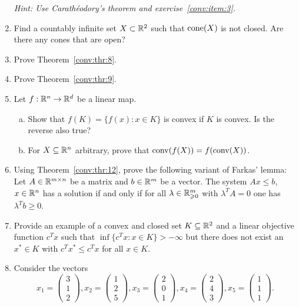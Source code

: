 \begin{enumerate}[1)]
  \emph{Hint: Use Carath\'eodory's theorem and exercise~\ref{conv:item:3}.}
\item Find a countably infinite set $X\subset\mathbb{R}^2$ such that $\mathrm{cone}(X)$ is not closed.
  Are there any cones that are open?
\item Prove Theorem~\ref{conv:thr:8}. 
\item Prove Theorem~\ref{conv:thr:9}. 
\item Let $f: \mathbb{R}^n \to \mathbb{R}^d$ be a linear map. 
  \begin{enumerate}[a)]
  \item Show that $f(K) = \{ f(x) \colon x \in K\}$  is convex if $K$ is
    convex.  Is the reverse also true? 
  \item  For $X\subseteq\mathbb{R}^n$ arbitrary, prove that $\operatorname{conv}(f(X)) = f(\operatorname{conv}(X))$.
  \end{enumerate}
\item
  \label{conv:ex:10}
  Using Theorem~\ref{conv:thr:12}, prove the following variant of Farkas' lemma:
  Let $A\in\mathbb{R}^{m\times n}$ be a matrix and $b\in\mathbb{R}^m$ be a vector.
  The system $Ax \leq b$, $x\in\mathbb{R}^n$ has a solution if and only if
  for all $\lambda\in\mathbb{R}^m_{\geqslant0}$ with $\lambda^T A = 0$ one has $\lambda^T b \geq 0$.
\item 
  \label{ex:16}
  Provide an example of a convex and closed  set $K\subseteq\mathbb{R}^2$ and a
  linear objective function $c^Tx$ such that $\inf\{c^Tx \colon
  x\in K\}>-\infty$ but there does not exist an $x^* \in K$ with $c^Tx^* \leq
  c^Tx$ for all $x \in K$. 
\item Consider the vectors
$$ x_1 = \left(\begin{array}{c} 3 \\ 1 \\ 2\end{array}\right), x_2 = \left(\begin{array}{c} 1 \\ 2 \\ 5 \end{array}\right), x_3 = \left(\begin{array}{c} 2 \\ 0 \\ 1 \end{array}\right), x_4 = \left(\begin{array}{c}  2 \\ 4 \\ 3 \end{array}\right), x_5 = \left(\begin{array}{c}  1 \\ 1 \\ 1 \end{array}\right). $$


\end{enumerate}
